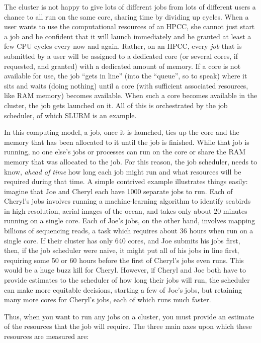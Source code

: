 \documentclass[]{krantz}
\begin{document}
The cluster is not happy to give lots of different jobs
from lots of different users a chance to all run on the same core, sharing time by dividing up cycles.
When a user wants to use the computational resources of an HPCC,
she cannot just start a job and be confident that it will launch immediately and be granted
at least a few CPU cycles every now and again. Rather, on an HPCC, every \emph{job} that is submitted
by a user will be assigned to a dedicated core (or several cores, if requested, and granted)
with a dedicated amount of memory.
If a core is not available for use, the job ``gets in line'' (into the ``queue'', so to speak)
where it sits and waits (doing nothing) until a core
(with sufficient associated resources, like RAM memory) becomes available. When such a core
becomes available in the cluster, the job gets launched on it. All of this is orchestrated by the job scheduler,
of which SLURM is an example.

In this computing model, a job, once it is launched, ties up the core and the memory
that has been allocated to it until the job is finished. While that job is running, no one
else's jobs or processes can run on the core or share the RAM memory that was allocated to the job.
For this reason, the job scheduler, needs to know, \emph{ahead of time} how long each job might run and
what resources will be required during that time. A simple contrived example illustrates things easily:
imagine that Joe and Cheryl each have 1000 separate jobs to run. Each of Cheryl's jobs involves running
a machine-learning algorithm to identify seabirds in high-resolution, aerial images of the ocean, and
takes only about 20 minutes running on a single core. Each of Joe's jobs, on the other hand, involves mapping billions of
sequencing reads, a task which requires about 36 hours when run on a single core.
If their cluster has only 640 cores, and Joe submits his jobs first,
then, if the job scheduler were naive, it might put all of his jobs in line first, requiring some 50 or 60 hours
before the first of Cheryl's jobs even runs. This would be a huge buzz kill for Cheryl.
However, if Cheryl and Joe both have to provide estimates to the scheduler of how
long their jobs will run, the scheduler can make more equitable decisions, starting a few of Joe's jobs, but retaining
many more cores for Cheryl's jobs, each of which runs much faster.

Thus, when you want to run any jobs on a cluster, you must provide an estimate of the resources
that the job will require. The three main axes upon which these resources are measured are:
\end{document}

